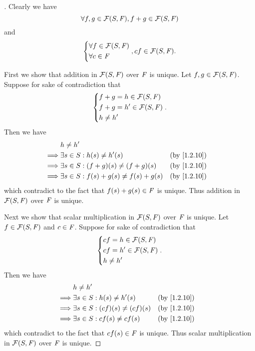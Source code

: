 \begin{proof}[]
	Clearly we have
	\[
		\forall f, g \in \FS, f + g \in \FS
	\]
	and
	\[
		\begin{dcases}
			\forall f \in \FS \\
			\forall c \in \F
		\end{dcases}, cf \in \FS.
	\]

	First we show that addition in \(\FS\) over \(\mathit{F}\) is unique.
	Let \(f, g \in \FS\).
	Suppose for sake of contradiction that
	\[
		\begin{dcases}
			f + g = h \in \FS  \\
			f + g = h' \in \FS \\
			h \neq h'
		\end{dcases}.
	\]
	Then we have
	\begin{align*}
		         & h \neq h'                                                                     \\
		\implies & \exists s \in S : h(s) \neq h'(s)              &  & \text{(by \cref{1.2.10})} \\
		\implies & \exists s \in S : (f + g)(s) \neq (f + g)(s)   &  & \text{(by \cref{1.2.10})} \\
		\implies & \exists s \in S : f(s) + g(s) \neq f(s) + g(s) &  & \text{(by \cref{1.2.10})}
	\end{align*}
	which contradict to the fact that \(f(s) + g(s) \in \mathit{F}\) is unique.
	Thus addition in \(\FS\) over \(\mathit{F}\) is unique.

	Next we show that scalar multiplication in \(\FS\) over \(\mathit{F}\) is unique.
	Let \(f \in \FS\) and \(c \in \mathit{F}\).
	Suppose for sake of contradiction that
	\[
		\begin{dcases}
			cf = h \in \FS  \\
			cf = h' \in \FS \\
			h \neq h'
		\end{dcases}.
	\]
	Then we have
	\begin{align*}
		         & h \neq h'                                                             \\
		\implies & \exists s \in S : h(s) \neq h'(s)      &  & \text{(by \cref{1.2.10})} \\
		\implies & \exists s \in S : (cf)(s) \neq (cf)(s) &  & \text{(by \cref{1.2.10})} \\
		\implies & \exists s \in S : cf(s) \neq cf(s)     &  & \text{(by \cref{1.2.10})}
	\end{align*}
	which contradict to the fact that \(cf(s) \in \mathit{F}\) is unique.
	Thus scalar multiplication in \(\FS\) over \(\mathit{F}\) is unique.


\end{proof}

